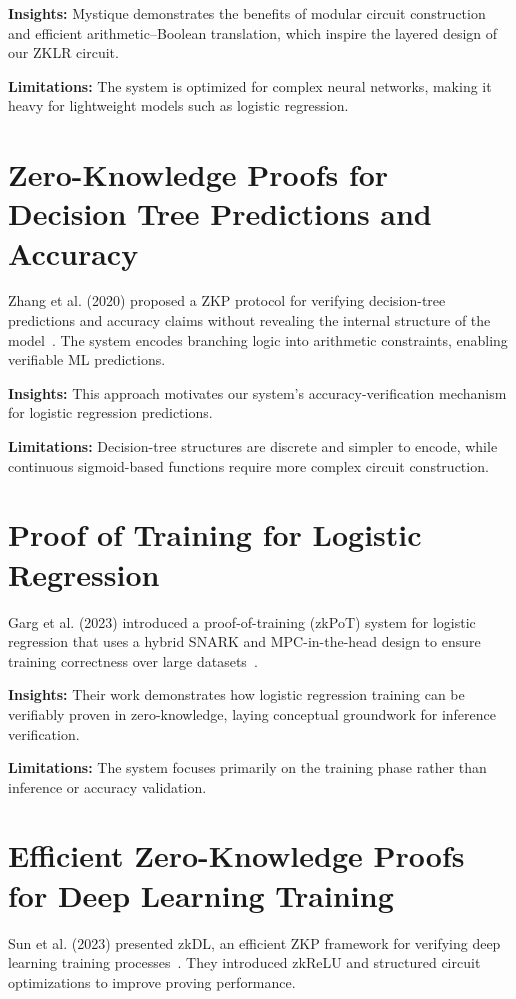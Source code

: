 \textbf{Insights:}  
Mystique demonstrates the benefits of modular circuit construction and efficient arithmetic–Boolean translation, which inspire the layered design of our ZKLR circuit.

\textbf{Limitations:}  
The system is optimized for complex neural networks, making it heavy for lightweight models such as logistic regression.

\section{Zero-Knowledge Proofs for Decision Tree Predictions and Accuracy}

Zhang et al. (2020) proposed a ZKP protocol for verifying decision-tree predictions and accuracy claims without revealing the internal structure of the model~\cite{10.1145/3372297.3417278}.  
The system encodes branching logic into arithmetic constraints, enabling verifiable ML predictions.

\textbf{Insights:}  
This approach motivates our system’s accuracy-verification mechanism for logistic regression predictions.

\textbf{Limitations:}  
Decision-tree structures are discrete and simpler to encode, while continuous sigmoid-based functions require more complex circuit construction.

\section{Proof of Training for Logistic Regression}

Garg et al. (2023) introduced a proof-of-training (zkPoT) system for logistic regression that uses a hybrid SNARK and MPC-in-the-head design to ensure training correctness over large datasets~\cite{cryptoeprint:2023/1345}.

\textbf{Insights:}  
Their work demonstrates how logistic regression training can be verifiably proven in zero-knowledge, laying conceptual groundwork for inference verification.

\textbf{Limitations:}  
The system focuses primarily on the training phase rather than inference or accuracy validation.

\section{Efficient Zero-Knowledge Proofs for Deep Learning Training}

Sun et al. (2023) presented zkDL, an efficient ZKP framework for verifying deep learning training processes~\cite{cryptoeprint:2023/1174}.  
They introduced zkReLU and structured circuit optimizations to improve proving performance.

